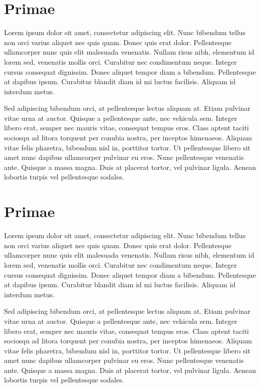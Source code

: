 \documentclass[balance]{test1}
\begin{document}
\section*{Primae}
Lorem ipsum dolor sit amet, consectetur adipiscing elit. Nunc bibendum tellus non orci varius aliquet nec quis quam. Donec quis erat dolor. Pellentesque ullamcorper nunc quis elit malesuada venenatis. Nullam risus nibh, elementum id lorem sed, venenatis mollis orci. Curabitur nec condimentum neque. Integer cursus consequat dignissim. Donec aliquet tempor diam a bibendum. Pellentesque at dapibus ipsum. Curabitur blandit diam id mi luctus facilisis. Aliquam id interdum metus.

Sed adipiscing bibendum orci, at pellentesque lectus aliquam at. Etiam pulvinar vitae urna at auctor. Quisque a pellentesque ante, nec vehicula sem. Integer libero erat, semper nec mauris vitae, consequat tempus eros. Class aptent taciti sociosqu ad litora torquent per conubia nostra, per inceptos himenaeos. Aliquam vitae felis pharetra, bibendum nisl in, porttitor tortor. Ut pellentesque libero sit amet nunc dapibus ullamcorper pulvinar eu eros. Nunc pellentesque venenatis ante. Quisque a massa magna. Duis at placerat tortor, vel pulvinar ligula. Aenean lobortis turpis vel pellentesque sodales.


\section*{Primae}
Lorem ipsum dolor sit amet, consectetur adipiscing elit. Nunc bibendum tellus non orci varius aliquet nec quis quam. Donec quis erat dolor. Pellentesque ullamcorper nunc quis elit malesuada venenatis. Nullam risus nibh, elementum id lorem sed, venenatis mollis orci. Curabitur nec condimentum neque. Integer cursus consequat dignissim. Donec aliquet tempor diam a bibendum. Pellentesque at dapibus ipsum. Curabitur blandit diam id mi luctus facilisis. Aliquam id interdum metus.

Sed adipiscing bibendum orci, at pellentesque lectus aliquam at. Etiam pulvinar vitae urna at auctor. Quisque a pellentesque ante, nec vehicula sem. Integer libero erat, semper nec mauris vitae, consequat tempus eros. Class aptent taciti sociosqu ad litora torquent per conubia nostra, per inceptos himenaeos. Aliquam vitae felis pharetra, bibendum nisl in, porttitor tortor. Ut pellentesque libero sit amet nunc dapibus ullamcorper pulvinar eu eros. Nunc pellentesque venenatis ante. Quisque a massa magna. Duis at placerat tortor, vel pulvinar ligula. Aenean lobortis turpis vel pellentesque sodales.
\end{document}
